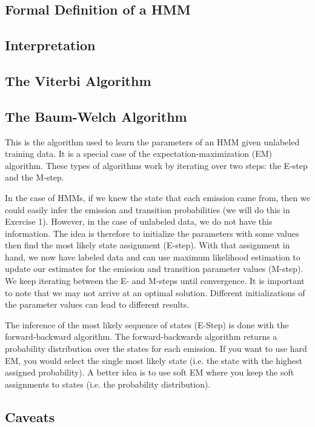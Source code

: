 \documentclass[11pt, oneside]{article}
\begin{document}
\subsection{Formal Definition of a HMM}
\subsection{Interpretation}
\subsection{The Viterbi Algorithm}
\subsection{The Baum-Welch Algorithm}

This is the algorithm used to learn the parameters of an HMM given unlabeled training data. 
It is a special case of the expectation-maximization (EM) algorithm. These types of algorithms work by iterating over two steps: the E-step and the M-step.

In the case of HMMs, if we knew the state that each emission came from, then we could easily infer the emission and transition probabilities (we will do this in Exercise 1). However, in the case of unlabeled data, we do not have this information. The idea is therefore to initialize the parameters with some values then find the most likely state assignment (E-step). With that assignment in hand, we now have labeled data and can use maximum likelihood estimation to update our estimates for the emission and transition parameter values (M-step). We keep iterating between the E- and M-steps until convergence. It is important to note that we may not arrive at an optimal solution. Different initializations of the parameter values can lead to different results.

The inference of the most likely sequence of states (E-Step) is done with the forward-backward algorithm. The forward-backwards algorithm returns a probability distribution over the states for each emission. If you want to use hard EM, you would select the single most likely state (i.e. the state with the highest assigned probability). A better idea is to use soft EM where you keep the soft assignments to states (i.e. the probability distribution).

\subsection{Caveats}
\end{document}
